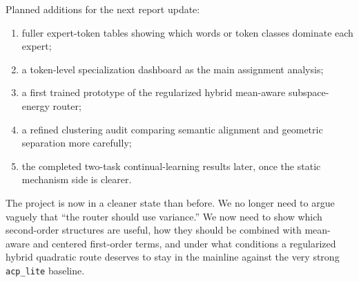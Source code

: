 \documentclass[11pt]{article}
\begin{document}
Planned additions for the next report update:
\begin{enumerate}
    \item fuller expert-token tables showing which words or token classes dominate each expert;
    \item a token-level specialization dashboard as the main assignment analysis;
    \item a first trained prototype of the regularized hybrid mean-aware subspace-energy router;
    \item a refined clustering audit comparing semantic alignment and geometric separation more carefully;
    \item the completed two-task continual-learning results later, once the static mechanism side is clearer.
\end{enumerate}

The project is now in a cleaner state than before. We no longer need to argue vaguely that ``the router should use variance.'' We now need to show which second-order structures are useful, how they should be combined with mean-aware and centered first-order terms, and under what conditions a regularized hybrid quadratic route deserves to stay in the mainline against the very strong \texttt{acp\_lite} baseline.
\end{document}

